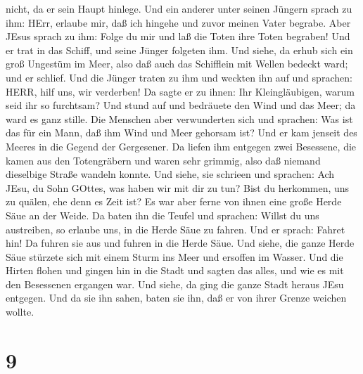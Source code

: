nicht, da er sein Haupt hinlege.  Und ein anderer unter
seinen Jüngern sprach zu ihm: HErr, erlaube mir, daß ich hingehe und
zuvor meinen Vater begrabe.  Aber JEsus sprach zu ihm:
Folge du mir und laß die Toten ihre Toten begraben!  Und er
trat in das Schiff, und seine Jünger folgeten ihm.  Und
siehe, da erhub sich ein groß Ungestüm im Meer, also daß auch das
Schifflein mit Wellen bedeckt ward; und er schlief.  Und
die Jünger traten zu ihm und weckten ihn auf und sprachen: HERR, hilf
uns, wir verderben!  Da sagte er zu ihnen: Ihr
Kleingläubigen, warum seid ihr so furchtsam? Und stund auf und bedräuete
den Wind und das Meer; da ward es ganz stille.  Die
Menschen aber verwunderten sich und sprachen: Was ist das für ein Mann,
daß ihm Wind und Meer gehorsam ist?  Und er kam jenseit des
Meeres in die Gegend der Gergesener. Da liefen ihm entgegen zwei
Besessene, die kamen aus den Totengräbern und waren sehr grimmig, also
daß niemand dieselbige Straße wandeln konnte.  Und siehe,
sie schrieen und sprachen: Ach JEsu, du Sohn GOttes, was haben wir mit
dir zu tun? Bist du herkommen, uns zu quälen, ehe denn es Zeit ist?
 Es war aber ferne von ihnen eine große Herde Säue an der
Weide.  Da baten ihn die Teufel und sprachen: Willst du uns
austreiben, so erlaube uns, in die Herde Säue zu fahren. 
Und er sprach: Fahret hin! Da fuhren sie aus und fuhren in die Herde
Säue. Und siehe, die ganze Herde Säue stürzete sich mit einem Sturm ins
Meer und ersoffen im Wasser.  Und die Hirten flohen und
gingen hin in die Stadt und sagten das alles, und wie es mit den
Besessenen ergangen war.  Und siehe, da ging die ganze
Stadt heraus JEsu entgegen. Und da sie ihn sahen, baten sie ihn, daß er
von ihrer Grenze weichen wollte.

\hypertarget{section-8}{%
\section{9}\label{section-8}}

